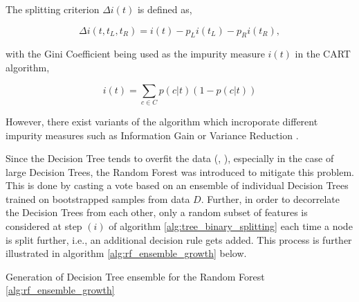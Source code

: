 The splitting criterion $ \Delta i(t) $ is defined as, 

\begin{equation}
    \Delta i(t, t_{L}, t_{R}) = i(t) - p_{L} i(t_{L}) - p_{R} i(t_{R}),
\end{equation}

with the Gini Coefficient being used as the impurity measure $i(t)$ in the CART algorithm,

\begin{equation}
    i(t) = \sum_{c \in C} p(c|t) (1 - p(c|t))
\end{equation}

However, there exist variants of the algorithm which incroporate different impurity measures such as
Information Gain or Variance Reduction \cite{rutkowski2011cart}.

Since the Decision Tree tends to overfit the data (\cite{kerdprasop2011discreteDecisionTree}, \cite{geman1992biasVariance}),
especially in the case of large Decision Trees,
the Random Forest was introduced to mitigate this problem. This is done by casting a vote based on an 
ensemble of individual Decision Trees trained on bootstrapped samples from data $D$. 
Further, in order to decorrelate the Decision Trees from each other, 
only a random subset of features is considered at step $(i)$ of algorithm \ref{alg:tree_binary_splitting} 
each time a node is split further, i.e., an additional decision rule gets added.
This process is further illustrated in algorithm \ref{alg:rf_ensemble_growth} below.

\begin{algorithm}[H]
    \caption{ Generation of Decision Tree ensemble for the Random Forest \ref{alg:rf_ensemble_growth} }
    \label{alg:rf_ensemble_growth}
\end{algorithm}

